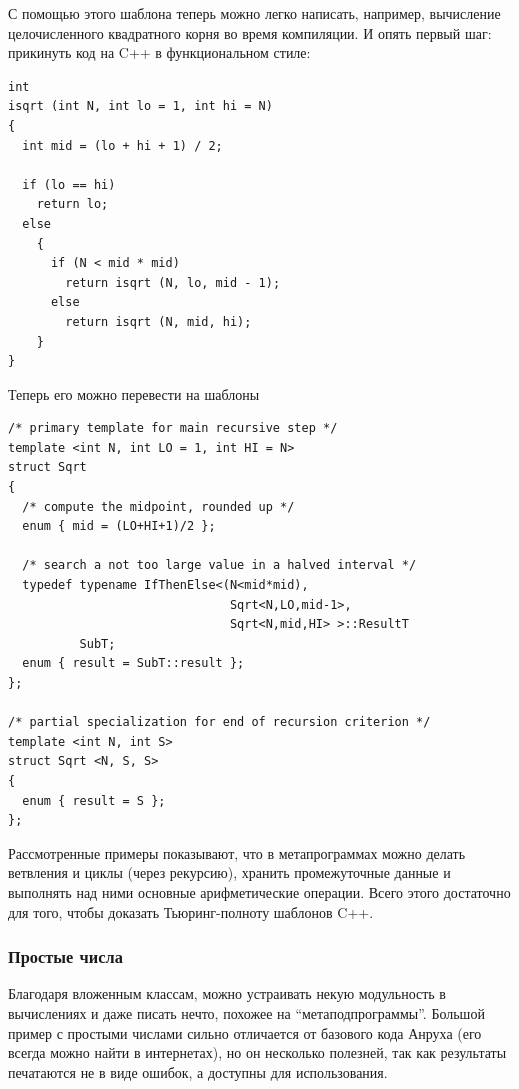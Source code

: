 \documentclass[a4paper,12pt,oneside]{article}
\begin{document}
С помощью этого шаблона теперь можно легко написать, например, вычисление целочисленного квадратного корня во время компиляции.
И опять первый шаг: прикинуть код на C++ в функциональном стиле:

\begin{lstlisting}
int
isqrt (int N, int lo = 1, int hi = N)
{
  int mid = (lo + hi + 1) / 2;

  if (lo == hi)
    return lo;
  else
    {
      if (N < mid * mid)
        return isqrt (N, lo, mid - 1);
      else
        return isqrt (N, mid, hi);
    }
}
\end{lstlisting}

Теперь его можно перевести на шаблоны

\begin{lstlisting}
/* primary template for main recursive step */
template <int N, int LO = 1, int HI = N> 
struct Sqrt 
{ 
  /* compute the midpoint, rounded up */
  enum { mid = (LO+HI+1)/2 }; 

  /* search a not too large value in a halved interval */
  typedef typename IfThenElse<(N<mid*mid), 
                               Sqrt<N,LO,mid-1>, 
                               Sqrt<N,mid,HI> >::ResultT 
          SubT; 
  enum { result = SubT::result }; 
}; 

/* partial specialization for end of recursion criterion */
template <int N, int S> 
struct Sqrt <N, S, S> 
{ 
  enum { result = S }; 
}; 
\end{lstlisting}

Рассмотренные примеры показывают, что в метапрограммах можно делать ветвления и циклы (через рекурсию), хранить промежуточные данные и выполнять над ними основные арифметические операции. Всего этого достаточно для того, чтобы доказать Тьюринг-полноту шаблонов C++.

\subsubsection{Простые числа}\label{TemplatePrimes}

Благодаря вложенным классам, можно устраивать некую модульность в вычислениях и даже писать нечто, похожее на ``метаподпрограммы''. Большой пример с простыми числами сильно отличается от базового кода Анруха (его всегда можно найти в интернетах), но он несколько полезней, так как результаты печатаются не в виде ошибок, а доступны для использования.
\end{document}
